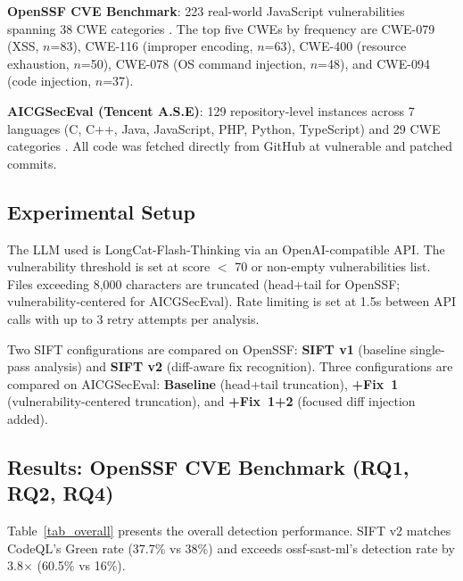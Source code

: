 \documentclass[conference]{IEEEtran}
\begin{document}
\textbf{OpenSSF CVE Benchmark}: 223 real-world JavaScript vulnerabilities spanning 38 CWE categories \cite{b18}. The top five CWEs by frequency are CWE-079 (XSS, $n$=83), CWE-116 (improper encoding, $n$=63), CWE-400 (resource exhaustion, $n$=50), CWE-078 (OS command injection, $n$=48), and CWE-094 (code injection, $n$=37).

\textbf{AICGSecEval (Tencent A.S.E)}: 129 repository-level instances across 7 languages (C, C++, Java, JavaScript, PHP, Python, TypeScript) and 29 CWE categories \cite{b19}. All code was fetched directly from GitHub at vulnerable and patched commits.

\subsection{Experimental Setup}

The LLM used is LongCat-Flash-Thinking via an OpenAI-compatible API. The vulnerability threshold is set at score $<$ 70 or non-empty vulnerabilities list. Files exceeding 8,000 characters are truncated (head+tail for OpenSSF; vulnerability-centered for AICGSecEval). Rate limiting is set at 1.5s between API calls with up to 3 retry attempts per analysis.

Two SIFT configurations are compared on OpenSSF: \textbf{SIFT v1} (baseline single-pass analysis) and \textbf{SIFT v2} (diff-aware fix recognition). Three configurations are compared on AICGSecEval: \textbf{Baseline} (head+tail truncation), \textbf{+Fix~1} (vulnerability-centered truncation), and \textbf{+Fix~1+2} (focused diff injection added).

\subsection{Results: OpenSSF CVE Benchmark (RQ1, RQ2, RQ4)}

Table~\ref{tab_overall} presents the overall detection performance. SIFT v2 matches CodeQL's Green rate (37.7\% vs 38\%) and exceeds ossf-sast-ml's detection rate by 3.8$\times$ (60.5\% vs 16\%).
\end{document}
